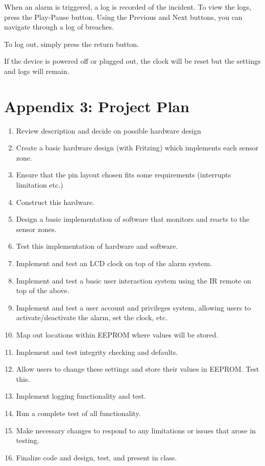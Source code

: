 \documentclass[a4paper,11pt]{article}
\theoremstyle{mytheor}
\begin{document}
When an alarm is triggered, a log is recorded of the incident. To view the logs, press the Play-Pause button. Using the Previous and Next buttons, you can navigate through a log of breaches.

To log out, simply press the return button.

If the device is powered off or plugged out, the clock will be reset but the settings and logs will remain. 

\section{Appendix 3: Project Plan}
\begin{enumerate}
    \item Review description and decide on possible hardware design
    \item Create a basic hardware design (with Fritzing) which implements each sensor zone.
    \item Ensure that the pin layout chosen fits some requirements (interrupts limitation etc.)
    \item Construct this hardware.
    \item Design a basic implementation of software that monitors and reacts to the sensor zones.
    \item Test this implementation of hardware and software.
    \item Implement and test an LCD clock on top of the alarm system.
    \item Implement and test a basic user interaction system using the IR remote on top of the above.
    \item Implement and test a user account and privileges system, allowing users to activate/deactivate the alarm, set the clock, etc.
    \item Map out locations within EEPROM where values will be stored.
    \item Implement and test integrity checking and defaults.
    \item Allow users to change these settings and store their values in EEPROM. Test this.
    \item Implement logging functionality and test.
    \item Run a complete test of all functionality.
    \item Make necessary changes to respond to any limitations or issues that arose in testing.
    \item Finalize code and design, test, and present in class.
\end{enumerate}
\end{document}
